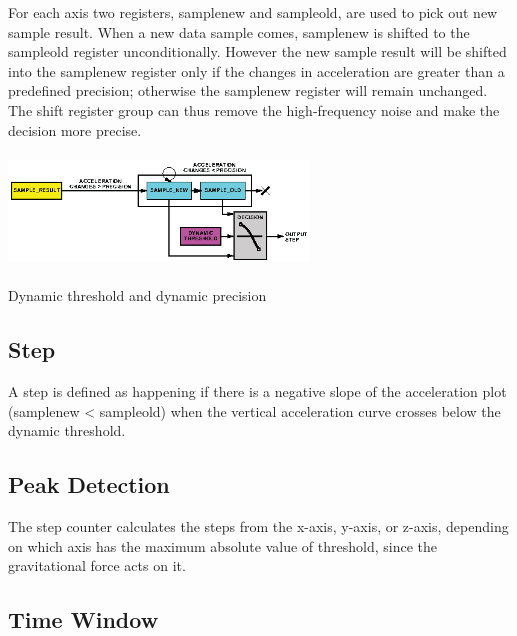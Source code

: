 \documentclass[a4paper,10pt]{article}
\makeatletter
\newenvironment{figurehere}{\def\@captype{figure}\vspace{2ex}}{\vspace{1ex}}
\makeatother
\begin{document}
\begin{multicols}{2}
For each axis two registers, sample\textunderscore new and sample\textunderscore old, are used to pick out new sample result. When a new data sample comes, sample\textunderscore new is shifted to the sample\textunderscore old register unconditionally. However the new sample result will be shifted into the sample\textunderscore new register only if the changes in acceleration are greater than a predefined precision; otherwise the sample\textunderscore new register will remain unchanged. The shift register group can thus remove the high-frequency noise and make the decision more precise.

\begin{figurehere}
 \centering
 \includegraphics[width=8cm, height=3cm]{./eps/RegistersDiagram.eps}
 \caption{Dynamic threshold and dynamic precision}
 \label{fig:RegistersDiagram}
\end{figurehere}

\subsection{Step}

A step is defined as happening if there is a negative slope of the acceleration plot (sample\textunderscore new < sample\textunderscore old) when the vertical acceleration curve crosses below the dynamic threshold.

\subsection{Peak Detection}

The step counter calculates the steps from the x-axis, y-axis, or z-axis, depending on which axis has the maximum absolute value of threshold, since the gravitational force acts on it.

\subsection{Time Window}


\end{multicols}
\end{document}
